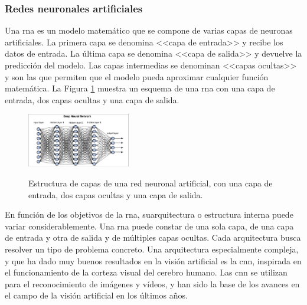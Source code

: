 \subsubsection{Redes neuronales artificiales}
Una \gls{rna} es un modelo matemático que se compone de varias capas de neuronas artificiales. La primera capa se denomina <<capa de entrada>> y recibe los datos de entrada. La última capa se denomina <<capa de salida>> y devuelve la predicción del modelo. Las capas intermedias se denominan <<capas ocultas>> y son las que permiten que el modelo pueda aproximar cualquier función matemática. La Figura \ref{fig:deep_neural_network} muestra un esquema de una \gls{rna} con una capa de entrada, dos capas ocultas y una capa de salida.


\begin{figure}[H]
    \caption[Estructura de capas de una red neuronal artificial]{Estructura de capas de una red neuronal artificial, con una capa de entrada, dos capas ocultas y una capa de salida.}
    \centering
    \includegraphics[width=0.4\textwidth]{./figuras/Deep_neural_network.png}
    \label{fig:deep_neural_network}
\end{figure}

En función de los objetivos de la \gls{rna}, suarquitectura o estructura interna puede variar considerablemente. Una \gls{rna} puede constar de una sola capa, de una capa de entrada y otra de salida y de múltiples capas ocultas. Cada arquitectura busca resolver un tipo de problema concreto. Una arquitectura especialmente compleja, y que ha dado muy buenos resultados en la visión artificial es la \gls{cnn}, inspirada en el funcionamiento de la corteza visual del cerebro humano. Las \gls{cnn} se utilizan para el reconocimiento de imágenes y vídeos, y han sido la base de los avances en el campo de la visión artificial en los últimos años.

